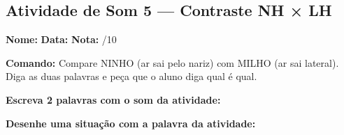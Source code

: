 \subsection{Atividade de Som 5 --- Contraste NH × LH}
\begin{exercicio}



\noindent\textbf{Nome:} \underline{\hspace{3.2cm}} \quad \textbf{Data:} \underline{\hspace{1.6cm}} \quad \textbf{Nota:} \underline{\hspace{0.9cm}}/10


\noindent\textbf{Comando:} Compare NINHO (ar sai pelo nariz) com MILHO (ar sai lateral). Diga as duas palavras e peça que o aluno diga qual é qual.


\begin{center}
\end{center}

\noindent\textbf{Escreva 2 palavras com o som da atividade:}

\begin{center}
  \underline{\hspace{3cm}} \quad \underline{\hspace{3cm}}
\end{center}

\noindent\textbf{Desenhe uma situação com a palavra da atividade:}

\begin{center}
\end{center}

\end{exercicio}



